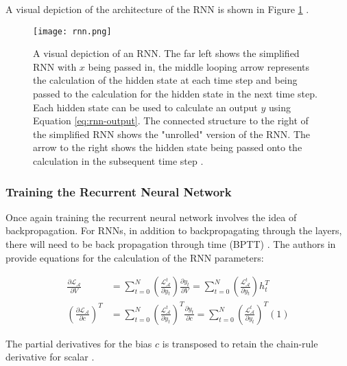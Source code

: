 A visual depiction of the architecture of the RNN is shown in Figure \ref{fig:rnn} \cite{CS231nConvolutionalNeural}.

\begin{figure}[ht]
    \centering
    \texttt{[image: rnn.png]}
    \caption{A visual depiction of an RNN. The far left shows the simplified RNN with $x$ being passed in, the middle looping arrow represents the calculation of the hidden state at each time step and being passed to the calculation for the hidden state in the next time step. Each hidden state can be used to calculate an output $y$ using Equation \ref{eq:rnn-output}. The connected structure to the right of the simplified RNN shows the "unrolled" version of the RNN. The arrow to the right shows the hidden state being passed onto the calculation in the subsequent time step \cite{CS231nConvolutionalNeural}.}
    \label{fig:rnn}
\end{figure}


\subsubsection{Training the Recurrent Neural Network}
Once again training the recurrent neural network involves the idea of backpropagation. For RNNs, in addition to backpropagating through the layers, there will need to be back propagation through time (BPTT) \cite{salemRecurrentNeuralNetworks2022}. The authors in \cite{salemRecurrentNeuralNetworks2022} provide equations for the calculation of the RNN parameters:

\begin{equation}
    \begin{split}
        \frac{\partial \mathcal{L}_\mathcal{A}}{\partial V} &= \sum_{t=0}^{N}\left(\frac{\mathcal{L}_\mathcal{A}^t}{\partial y_t}\right) \frac{\partial y_t}{\partial V} = \sum_{t=0}^{N}\left(\frac{\mathcal{L}_\mathcal{A}^t}{\partial y_t}\right) h_t^T \\
        \left(\frac{\partial \mathcal{L}_\mathcal{A}}{\partial c}\right)^T &= \sum_{t=0}^{N}\left(\frac{\mathcal{L}_\mathcal{A}^t}{\partial y_t}\right)^T \frac{\partial y_t}{\partial c} = \sum_{t=0}^{N}\left(\frac{\mathcal{L}_\mathcal{A}^t}{\partial y_t}\right)^T (1)
    \end{split}
\end{equation}

The partial derivatives for the bias $c$ is transposed to retain the chain-rule derivative for scalar \cite{salemRecurrentNeuralNetworks2022}. 

